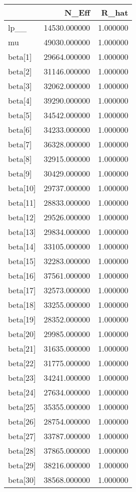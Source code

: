 \begin{tabular}{lrr}
\toprule
 & N\_Eff & R\_hat \\
\midrule
lp\_\_ & 14530.000000 & 1.000000 \\
mu & 49030.000000 & 1.000000 \\
beta[1] & 29664.000000 & 1.000000 \\
beta[2] & 31146.000000 & 1.000000 \\
beta[3] & 32062.000000 & 1.000000 \\
beta[4] & 39290.000000 & 1.000000 \\
beta[5] & 34542.000000 & 1.000000 \\
beta[6] & 34233.000000 & 1.000000 \\
beta[7] & 36328.000000 & 1.000000 \\
beta[8] & 32915.000000 & 1.000000 \\
beta[9] & 30429.000000 & 1.000000 \\
beta[10] & 29737.000000 & 1.000000 \\
beta[11] & 28833.000000 & 1.000000 \\
beta[12] & 29526.000000 & 1.000000 \\
beta[13] & 29834.000000 & 1.000000 \\
beta[14] & 33105.000000 & 1.000000 \\
beta[15] & 32283.000000 & 1.000000 \\
beta[16] & 37561.000000 & 1.000000 \\
beta[17] & 32573.000000 & 1.000000 \\
beta[18] & 33255.000000 & 1.000000 \\
beta[19] & 28352.000000 & 1.000000 \\
beta[20] & 29985.000000 & 1.000000 \\
beta[21] & 31635.000000 & 1.000000 \\
beta[22] & 31775.000000 & 1.000000 \\
beta[23] & 34241.000000 & 1.000000 \\
beta[24] & 27634.000000 & 1.000000 \\
beta[25] & 35355.000000 & 1.000000 \\
beta[26] & 28754.000000 & 1.000000 \\
beta[27] & 33787.000000 & 1.000000 \\
beta[28] & 37865.000000 & 1.000000 \\
beta[29] & 38216.000000 & 1.000000 \\
beta[30] & 38568.000000 & 1.000000 \\

\end{tabular}
